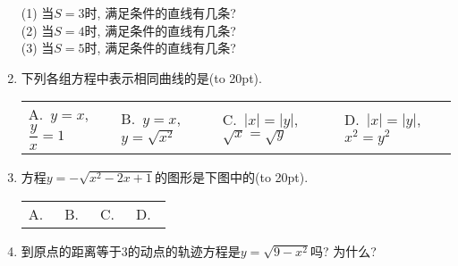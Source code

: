 \documentclass[10pt,a4paper]{article}
\newcommand{\bracket}[1]{(\hbox to #1pt{})}
\newcommand{\fourch}[4]{\par\begin{tabular}{p{.23\textwidth}p{.23\textwidth}p{.23\textwidth}p{.23\textwidth}}
A.~#1 &B.~#2& C.~#3& D.~#4
\end{tabular}}
\begin{document}
\begin{enumerate}[1.]
(1) 当$S=3$时, 满足条件的直线有几条?\\
(2) 当$S=4$时, 满足条件的直线有几条?\\
(3) 当$S=5$时, 满足条件的直线有几条?
\item 下列各组方程中表示相同曲线的是\bracket{20}.
\fourch{$y=x$, $\dfrac yx=1$}{$y=x$, $y=\sqrt {x^{2}}$}{$|x|=|y|$, $\sqrt x=\sqrt y$}{$|x|=|y|$, $x^2=y^2$}
\item 方程$y=-\sqrt {x^2-2x+1}$的图形是下图中的\bracket{20}.
\fourch{\begin{tikzpicture}[>=latex,scale = 0.7]
    \draw [->] (-2,0) -- (2,0) node [below] {$x$};
    \draw [->] (0,-2) -- (0,2) node [left] {$y$};
    \draw (0,0) node [below left] {$O$};
    \draw (-1,0.1) -- (-1,0) node [below] {$-1$};
    \draw (1,0.1) -- (1,0) node [below] {$1$};
    \draw (0.1,-1) -- (0,-1) node [left] {$-1$};
    \draw (0.1,1) -- (0,1) node [left] {$1$};
    \draw (-1,2) -- (2,-1) (-1,-2) -- (2,1);
\end{tikzpicture}}{\begin{tikzpicture}[>=latex,scale = 0.7]
    \draw [->] (-2,0) -- (2,0) node [below] {$x$};
    \draw [->] (0,-2) -- (0,2) node [left] {$y$};
    \draw (0,0) node [below left] {$O$};
    \draw (-1,0.1) -- (-1,0) node [below] {$-1$};
    \draw (1,0.1) -- (1,0) node [below] {$1$};
    \draw (0.1,-1) -- (0,-1) node [left] {$-1$};
    \draw (0.1,1) -- (0,1) node [left] {$1$};
    \draw (1,0) -- (2,-1) (1,0) -- (2,1);
\end{tikzpicture}}{\begin{tikzpicture}[>=latex,scale = 0.7]
    \draw [->] (-2,0) -- (2,0) node [below] {$x$};
    \draw [->] (0,-2) -- (0,2) node [left] {$y$};
    \draw (0,0) node [below left] {$O$};
    \draw (-1,0.1) -- (-1,0) node [below] {$-1$};
    \draw (1,0.1) -- (1,0) node [below] {$1$};
    \draw (0.1,-1) -- (0,-1) node [left] {$-1$};
    \draw (0.1,1) -- (0,1) node [left] {$1$};
    \draw (-1,-2) -- (1,0) (1,0) -- (2,-1);
\end{tikzpicture}}
{\begin{tikzpicture}[>=latex,scale = 0.7]
    \draw [->] (-2,0) -- (2,0) node [below] {$x$};
    \draw [->] (0,-2) -- (0,2) node [left] {$y$};
    \draw (0,0) node [below left] {$O$};
    \draw (-1,0.1) -- (-1,0) node [below] {$-1$};
    \draw (1,0.1) -- (1,0) node [below] {$1$};
    \draw (0.1,-1) -- (0,-1) node [left] {$-1$};
    \draw (0.1,1) -- (0,1) node [left] {$1$};
    \draw (-1,2) -- (1,0) (-1,-2) -- (1,0);
\end{tikzpicture}}
\item 到原点的距离等于$3$的动点的轨迹方程是$y=\sqrt {9-x^2}$吗? 为什么?

\end{enumerate}
\end{document}
